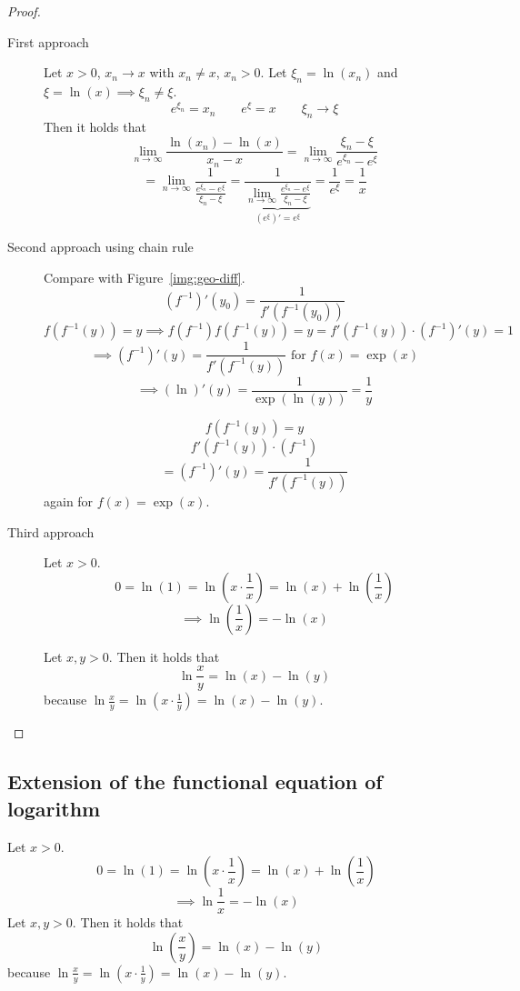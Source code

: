 \documentclass[a4paper,landscape,twocolumn]{article}
\theoremstyle{definition}
\begin{document}
\begin{proof}
  \begin{description}
    \item[First approach]
      Let $x > 0$, $x_n \to x$ with $x_n \neq x$, $x_n > 0$.
      Let $\xi_n = \ln(x_n)$ and $\xi = \ln(x) \implies \xi_n \neq \xi$.
      \[ e^{\xi_n} = x_n \qquad e^\xi = x \qquad \xi_n \to \xi \]
      Then it holds that
      \[ \lim_{n\to\infty} \frac{\ln(x_n) - \ln(x)}{x_n - x} = \lim_{n\to\infty} \frac{\xi_n - \xi}{e^{\xi_n} - e^\xi} \]
      \[
        = \lim_{n\to\infty} \frac{1}{\frac{e^{\xi_n} - e^\xi}{\xi_n - \xi}}
        = \frac{1}{\underbrace{\lim_{n\to\infty} \frac{e^{\xi_n} - e^\xi}{\xi_n - \xi}}_{(e^\xi)' = e^\xi}}
        = \frac1{e^\xi} = \frac1x
      \]
    \item[Second approach using chain rule]
      Compare with Figure~\ref{img:geo-diff}.
      \[ (f^{-1})'(y_0) = \frac{1}{f'(f^{-1}(y_0))} \]
      \[ f(f^{-1}(y)) = y \implies f(f^{-1}) f(f^{-1}(y)) = y = f'(f^{-1}(y)) \cdot (f^{-1})'(y) = 1 \]
      \[ \implies (f^{-1})'(y) = \frac{1}{f'(f^{-1}(y))} \text{ for } f(x) = \exp(x) \]
      \[ \implies (\ln)'(y) = \frac{1}{\exp(\ln(y))} = \frac{1}{y} \]

      \[ f(f^{-1}(y)) = y \]
      \[ f'(f^{-1}(y)) \cdot (f^{-1}) \]
      \[ = (f^{-1})'(y) = \frac{1}{f'(f^{-1}(y))} \]
      again for $f(x) = \exp(x)$.
    \item[Third approach]
      Let $x > 0$.
      \[ 0 = \ln(1) = \ln\left(x \cdot \frac1x\right) = \ln(x) + \ln\left(\frac1x\right) \]
      \[ \implies \ln\left(\frac1x\right) = -\ln(x) \]

      Let $x,y > 0$. Then it holds that
      \[ \ln{\frac{x}{y}} = \ln(x) - \ln(y) \]
      because $\ln\frac{x}{y} = \ln(x \cdot \frac1y) = \ln(x) - \ln(y)$.
  \end{description}
\end{proof}

\subsection{Extension of the functional equation of logarithm}
%
Let $x > 0$.
\[ 0 = \ln(1) = \ln\left(x \cdot \frac1x\right) = \ln(x) + \ln\left(\frac1{x}\right) \]
\[ \implies \ln\frac{1}{x} = -\ln(x) \]
Let $x,y > 0$. Then it holds that
\[ \ln(\frac{x}{y}) = \ln(x) - \ln(y) \]
because $\ln\frac{x}{y} = \ln\left(x \cdot \frac{1}{y}\right) = \ln(x) - \ln(y)$.
\end{document}
